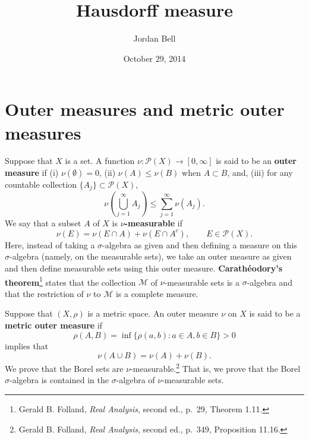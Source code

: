\documentclass{article}
\theoremstyle{definition}
\theoremstyle{definition}
\begin{document}
\title{Hausdorff measure}
\author{Jordan Bell}
\date{October 29, 2014}

\maketitle

\section{Outer measures and metric outer measures}
Suppose that $X$ is a set. A function $\nu:\mathscr{P}(X) \to [0,\infty]$ is said to be an \textbf{outer measure} if (i) $\nu(\emptyset)=0$, 
(ii) $\nu(A) \leq \nu(B)$ when
$A \subset B$, and, (iii) for any countable collection $\{A_j\} \subset \mathscr{P}(X)$,
\[
\nu\left(\bigcup_{j=1}^\infty A_j \right) \leq \sum_{j=1}^\infty \nu(A_j).
\]
We say that a subset $A$ of $X$ is \textbf{$\nu$-measurable} if 
\begin{equation}
\nu(E) = \nu(E \cap A)+ \nu(E \cap A^c), \qquad E \in \mathscr{P}(X).
\label{numeasurable}
\end{equation}
Here, instead of taking a $\sigma$-algebra as given and then defining a measure on this $\sigma$-algebra (namely, on the measurable sets), we take an outer
measure as given and then define measurable sets using this outer measure. \textbf{Carath\'eodory's theorem}\footnote{Gerald
B. Folland, {\em Real Analysis}, second ed., p.~29, Theorem 1.11.} states that the collection $\mathscr{M}$ of $\nu$-measurable sets is a
$\sigma$-algebra and that the restriction of $\nu$ to $\mathscr{M}$ is a complete measure. 

Suppose that $(X,\rho)$ is a metric space.  An outer measure $\nu$ on $X$ is said to be a \textbf{metric outer measure} if
\[
\rho(A,B)=\inf\{\rho(a,b):a \in A, b \in B\}>0
\]
 implies that 
\[
\nu(A \cup B) = \nu(A) + \nu(B).
\]
We prove
that the Borel sets are $\nu$-measurable.\footnote{Gerald B. Folland, {\em Real Analysis}, second ed., p.~349, Proposition 11.16.}
That is, we prove that the Borel $\sigma$-algebra is contained in the $\sigma$-algebra of $\nu$-measurable
sets.
\end{document}
